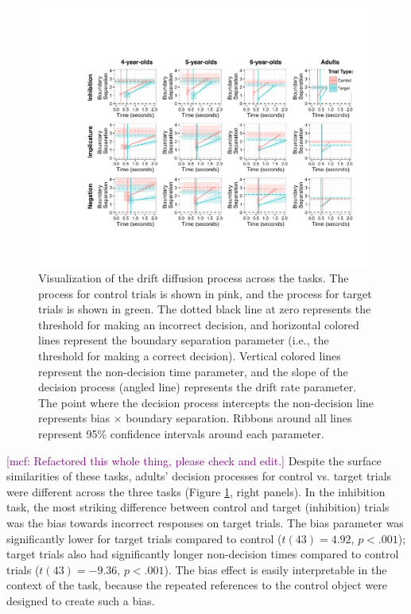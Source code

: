 \documentclass[10pt,letterpaper]{article}
\newcommand{\mcf}[1]{\textcolor{Purple}{[mcf: #1]}}
\begin{document}
\begin{figure}[t!]
\begin{center}
\includegraphics[width=7in]{figures/ddm_vis.pdf}
\caption{\label{fig:ddm} Visualization of the drift diffusion process across the tasks. The process for control trials is shown in pink, and the process for target trials is shown in green. The dotted black line at zero represents the threshold for making an incorrect decision, and horizontal colored lines represent the boundary separation parameter (i.e., the threshold for making a correct decision). Vertical colored lines represent the non-decision time parameter, and the slope of the decision process (angled line) represents the drift rate parameter. The point where the decision process intercepts the non-decision line represents bias $\times$ boundary separation. Ribbons around all lines represent 95\% confidence intervals around each parameter.}
\end{center}
\end{figure}

\mcf{Refactored this whole thing, please check and edit.}
Despite the surface similarities of these tasks, adults' decision processes for control vs. target trials were different across the three tasks (Figure \ref{fig:ddm}, right panels). In the inhibition task, the most striking difference between control and target (inhibition) trials was the bias towards incorrect responses on target trials. The bias parameter was significantly lower for target trials compared to control ($t(43) = 4.92$, $p< .001$); target trials also had significantly longer non-decision times compared to control trials ($t(43) = -9.36$, $p< .001$). The bias effect is easily interpretable in the context of the task, because the repeated references to the control object were designed to create such a bias.
\end{document}
